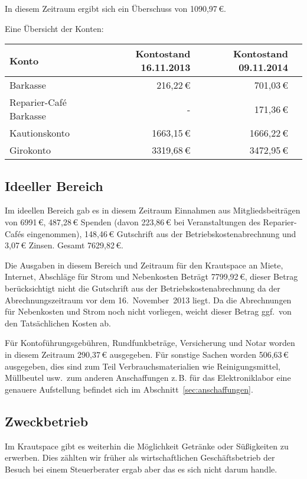 \documentclass[10pt,DIV16]{scrartcl}
\begin{document}
In diesem Zeitraum ergibt sich ein Überschuss von 1090,97\,\euro{}.

Eine Übersicht der Konten:
\begin{table}[h!]
	\begin{tabular}{l|r|r|r}
	\textbf{Konto} & \textbf{Kontostand 16.11.2013} & \textbf{Kontostand 09.11.2014} \\ \hline
	Barkasse & 216,22\,\euro & 701,03\,\euro \\
	Reparier-Café Barkasse & - & 171,36\,\euro \\
	Kautionskonto & 1663,15\,\euro & 1666,22\,\euro \\
	Girokonto & 3319,68\,\euro & 3472,95\,\euro \\
	\end{tabular}
\end{table}

\subsection{Ideeller Bereich}
\label{sec:ideeller_bereich}

Im ideellen Bereich gab es in diesem Zeitraum Einnahmen aus Mitgliedsbeiträgen von 6991\,\euro{}, 487,28\,\euro{} Spenden (davon 223,86\,\euro{} bei Veranstaltungen des Reparier-Cafés eingenommen), 148,46\,\euro{} Gutschrift aus der Betriebskostenabrechnung und 3,07\,\euro{} Zinsen.
Gesamt 7629,82\,\euro{}.

Die Ausgaben in diesem Bereich und Zeitraum für den Krautspace an Miete, Internet, Abschläge für Strom und Nebenkosten Beträgt 7799,92\,\euro{}, dieser Betrag berücksichtigt nicht die Gutschrift aus der Betriebskostenabrechnung da der Abrechnungszeitraum vor dem 16.~November~2013 liegt.
Da die Abrechnungen für Nebenkosten und Strom noch nicht vorliegen, weicht dieser Betrag ggf.\ von den Tatsächlichen Kosten ab.

Für Kontoführungsgebühren, Rundfunkbeträge, Versicherung und Notar worden in diesem Zeitraum 290,37\,\euro{} ausgegeben.
Für sonstige Sachen worden 506,63\,\euro{} ausgegeben, dies sind zum Teil Verbrauchsmaterialien wie Reinigungsmittel, Müllbeutel usw.\ zum anderen Anschaffungen z.\,B. für das Elektroniklabor eine genauere Aufstellung befindet sich im Abschnitt~\ref{sec:anschaffungen}.

\subsection{Zweckbetrieb}
\label{sec:Zweckbetrieb}
Im Krautspace gibt es weiterhin die Möglichkeit Getränke oder Süßigkeiten zu erwerben.
Dies zählten wir früher als wirtschaftlichen Geschäftsbetrieb der Besuch bei einem Steuerberater ergab aber das es sich nicht darum handle.
\end{document}
